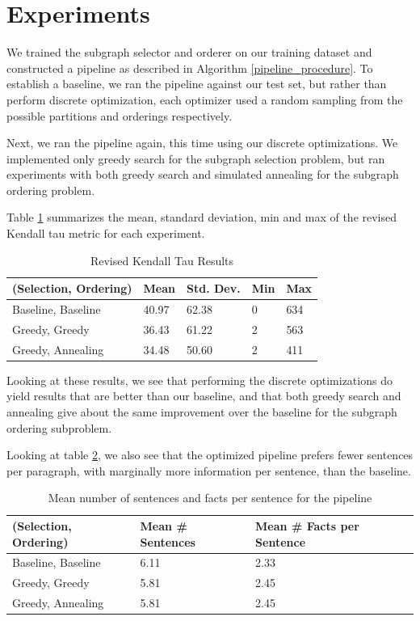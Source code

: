 \documentclass[12pt]{article}
\begin{document}
\section{Experiments}

We trained the subgraph selector and orderer on our training dataset and
constructed a pipeline as described in Algorithm \ref{pipeline_procedure}.
To establish a baseline, we ran the
pipeline against our test set, but rather than perform discrete optimization,
each optimizer used a random sampling from the possible partitions and 
orderings respectively.

Next, we ran the pipeline again, this time using our discrete optimizations.
We implemented only greedy search for the subgraph selection problem, but ran experiments with
both greedy search and simulated annealing for the subgraph ordering problem.

Table \ref{tab:experiments} summarizes the mean, standard deviation, min and max of the
revised Kendall tau metric for each experiment.

\begin{table}[H]
\centering
\caption{Revised Kendall Tau Results}
\label{tab:experiments}
\begin{tabular}{@{}lllll@{}}
\toprule
\textbf{(Selection, Ordering)} & \textbf{Mean} & \textbf{Std. Dev.} & \textbf{Min} & \textbf{Max} \\ \midrule
Baseline, Baseline & 40.97 & 62.38 & 0 & 634 \\
Greedy, Greedy & 36.43 & 61.22 & 2 & 563 \\
Greedy, Annealing & 34.48 & 50.60 & 2 & 411 \\ \bottomrule
\end{tabular}
\end{table}

Looking at these results, we see that performing the discrete optimizations do
yield results that are better than our baseline, and that both greedy search
and annealing give about the same improvement over the baseline for the
subgraph ordering subproblem.

Looking at table \ref{tab:metrics}, we also see that the optimized pipeline
prefers fewer sentences per paragraph, with marginally more information per
sentence, than the baseline.

\begin{table}[H]
\centering
\caption{Mean number of sentences and facts per sentence for the pipeline}
\label{tab:metrics}
\begin{tabular}{@{}lll@{}}
\toprule
\textbf{(Selection, Ordering)} & \textbf{Mean \# Sentences} & \textbf{Mean \# Facts per Sentence} \\ \midrule
Baseline, Baseline & 6.11 & 2.33 \\
Greedy, Greedy & 5.81 & 2.45\\
Greedy, Annealing & 5.81 & 2.45 \\ \bottomrule
\end{tabular}
\end{table}
\end{document}
